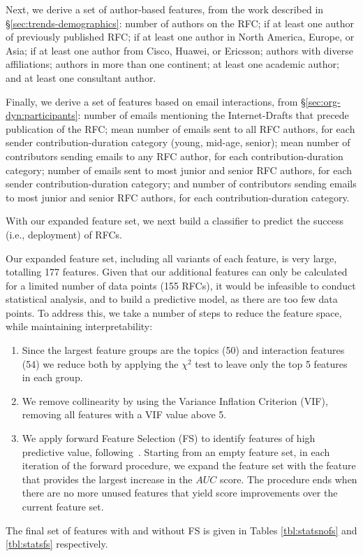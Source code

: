 \documentclass[twocolumn,10pt]{article}
\newcommand{\pb}[1]{\vspace{0.75ex}\noindent{\textbf{#1}}}
\begin{document}
Next, we derive a set of author-based features, from the work described in
\S\ref{sec:trends-demographics}: number of authors on the RFC; if at least
one author of previously published  RFC; if at least one author in North
America, Europe, or Asia; if at least one author from Cisco, Huawei, or
Ericsson; authors with diverse affiliations; authors in more than one
continent;  at least one academic author; and at least one consultant
author.

Finally, we derive a set of features based on email interactions, from
\S\ref{sec:org-dyn:participants}: number of emails mentioning the
Internet-Drafts that precede publication of the RFC; mean number of emails
sent to all RFC authors, for each sender contribution-duration category
(young, mid-age,  senior); mean number of contributors sending emails to
any RFC author, for each contribution-duration category; number of emails
sent to most junior and senior RFC authors, for each sender
contribution-duration category; and number of contributors sending emails
to most junior and senior RFC authors, for each contribution-duration
category.

\pb{Modelling Methodology:}
With our expanded feature set, we next build a classifier to predict the
success (i.e., deployment) of RFCs.

Our expanded feature set, including all variants of each feature, is very
large, totalling 177 features. Given that our additional features can only
be calculated for a limited number of data points (155 RFCs),  it would be
infeasible to conduct statistical analysis, and to build a predictive
model, as there are too few data points. To address this, we take a number
of steps to reduce the feature space, while maintaining interpretability:

\begin{enumerate}
  \item Since the largest feature groups are the topics (50) and
    interaction features (54) we reduce both by applying the $\chi^2$ test
    to leave only the top 5 features in each group. 

  \item We remove collinearity by using the Variance Inflation Criterion
    (VIF), removing all features with a VIF value above 5. 

  \item We apply forward Feature Selection (FS) to identify features of
    high predictive value, following~\cite{nikkhah2017statistical}.
    Starting from an empty feature set, in each iteration of the forward
    procedure, we expand the feature set with the feature that provides the
    largest increase in the $AUC$ score. The procedure ends when there are
    no more unused features that yield score improvements over the current
    feature set. 
\end{enumerate}
The final set of features with and without FS is given in Tables
\ref{tbl:statsnofs} and \ref{tbl:statsfs} respectively.
\end{document}
